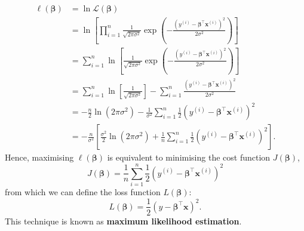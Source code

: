 \documentclass{article}
\begin{document}
\begin{align*}
    \ell\left( \symbf{\beta} \right) & = \ln{\mathcal{L}\left( \symbf{\beta} \right)}                                                                                                                                                                                  \\
                                     & = \ln{\left[ \prod_{i = 1}^n \frac{1}{\sqrt{2 \pi \sigma^2}} \exp\left( -\frac{{\left( y^{\left( i \right)} - \symbf{\beta}^\top \symbf{x}^{\left( i \right)} \right)}^2}{2 \sigma^2} \right) \right]}                          \\
                                     & = \sum_{i = 1}^n \ln{\left[ \frac{1}{\sqrt{2 \pi \sigma^2}} \exp\left( -\frac{{\left( y^{\left( i \right)} - \symbf{\beta}^\top \symbf{x}^{\left( i \right)} \right)}^2}{2 \sigma^2} \right) \right]}                           \\
                                     & = \sum_{i = 1}^n \ln{\left[ \frac{1}{\sqrt{2 \pi \sigma^2}} \right]} - \sum_{i = 1}^n \frac{{\left( y^{\left( i \right)} - \symbf{\beta}^\top \symbf{x}^{\left( i \right)} \right)}^2}{2 \sigma^2}                              \\
                                     & = -\frac{n}{2} \ln{\left( 2 \pi \sigma^2 \right)} - \frac{1}{\sigma^2} \sum_{i = 1}^n \frac{1}{2} {\left( y^{\left( i \right)} - \symbf{\beta}^\top \symbf{x}^{\left( i \right)} \right)}^2                                     \\
                                     & = - \frac{n}{\sigma^2} \left[ \frac{\sigma^2}{2} \ln{\left( 2 \pi \sigma^2 \right)} + \frac{1}{n} \sum_{i = 1}^n \frac{1}{2} {\left( y^{\left( i \right)} - \symbf{\beta}^\top \symbf{x}^{\left( i \right)} \right)}^2 \right].
\end{align*}
Hence, maximising \(\ell\left( \symbf{\beta} \right)\) is equivalent to
minimising the cost function \(J\left( \symbf{\beta} \right)\),
\begin{equation*}
    J\left( \symbf{\beta} \right) = \frac{1}{n} \sum_{i = 1}^n \frac{1}{2} {\left( y^{\left( i \right)} - \symbf{\beta}^\top \symbf{x}^{\left( i \right)} \right)}^2
\end{equation*}
from which we can define the loss function \(L\left( \symbf{\beta} \right)\):
\begin{equation*}
    L\left( \symbf{\beta} \right) = \frac{1}{2} {\left( y - \symbf{\beta}^\top \symbf{x} \right)}^2.
\end{equation*}
This technique is known as \textbf{maximum likelihood estimation}.
\end{document}
